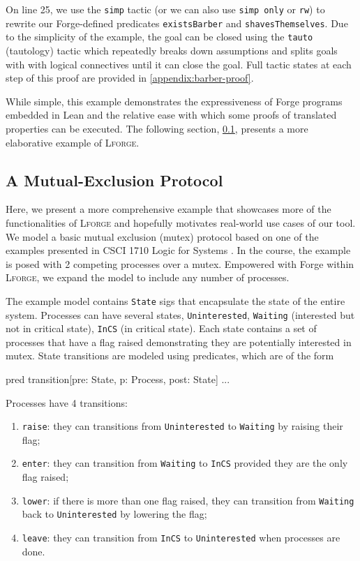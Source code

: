On line 25, we use the \texttt{simp} tactic (or we can also use \texttt{simp only} or \texttt{rw}) to rewrite our Forge-defined predicates \texttt{existsBarber} and \texttt{shavesThemselves}. Due to the simplicity of the example, the goal can be closed using the \texttt{tauto} (tautology) tactic which repeatedly breaks down assumptions and splits goals with with logical connectives until it can close the goal. Full tactic states at each step of this proof are provided in \cref{appendix:barber-proof}. 

While simple, this example demonstrates the expressiveness of Forge programs embedded in Lean and the relative ease with which some proofs of translated properties can be executed. The following section, \cref{sec:mutex}, presents a more elaborative example of \textsc{Lforge}.

\subsection{A Mutual-Exclusion Protocol}\label{sec:mutex}

Here, we present a more comprehensive example that showcases more of the functionalities of \textsc{Lforge} and hopefully motivates real-world use cases of our tool. We model a basic mutual exclusion (mutex) protocol based on one of the examples presented in CSCI 1710 Logic for Systems \cite{l4s}. In the course, the example is posed with 2 competing processes over a mutex. Empowered with Forge within \textsc{Lforge}, we expand the model to include any number of processes. 

The example model contains \texttt{State} sigs that encapsulate the state of the entire system. Processes can have several states, \texttt{Uninterested}, \texttt{Waiting} (interested but not in critical state), \texttt{InCS} (in critical state). Each state contains a set of processes that have a flag raised demonstrating they are potentially interested in mutex. State transitions are modeled using predicates, which are of the form

\begin{forge*}
pred transition[pre: State, p: Process, post: State] { ... }
\end{forge*}
Processes have 4 transitions: 
\begin{enumerate}
  \item \texttt{raise}: they can transitions from \texttt{Uninterested} to \texttt{Waiting} by raising their flag;
  \item \texttt{enter}: they can transition from \texttt{Waiting} to \texttt{InCS} provided they are the only flag raised;
  \item \texttt{lower}: if there is more than one flag raised, they can transition from \texttt{Waiting} back to \texttt{Uninterested} by lowering the flag;
  \item \texttt{leave}: they can transition from \texttt{InCS} to \texttt{Uninterested} when processes are done.
\end{enumerate}

